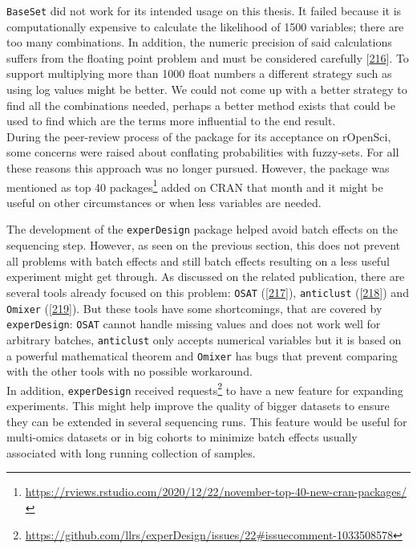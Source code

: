 \documentclass[
  a4paper,
]{book}
\DeclareRobustCommand{\href}[2]{#2\footnote{\url{#1}}}
\begin{document}
\texttt{BaseSet} did not work for its intended usage on this thesis.
It failed because it is computationally expensive to calculate the likelihood of 1500 variables; there are too many combinations.
In addition, the numeric precision of said calculations suffers from the floating point problem and must be considered carefully {[}\protect\hyperlink{ref-goldberg1991}{216}{]}.
To support multiplying more than 1000 float numbers a different strategy such as using log values might be better.
We could not come up with a better strategy to find all the combinations needed, perhaps a better method exists that could be used to find which are the terms more influential to the end result.\\
During the peer-review process of the package for its acceptance on rOpenSci, some concerns were raised about conflating probabilities with fuzzy-sets.
For all these reasons this approach was no longer pursued.
However, the package was mentioned as \href{https://rviews.rstudio.com/2020/12/22/november-top-40-new-cran-packages/}{top 40 packages} added on CRAN that month and it might be useful on other circumstances or when less variables are needed.

The development of the \texttt{experDesign} package helped avoid batch effects on the sequencing step.
However, as seen on the previous section, this does not prevent all problems with batch effects and still batch effects resulting on a less useful experiment might get through.
As discussed on the related publication, there are several tools already focused on this problem: \texttt{OSAT} ({[}\protect\hyperlink{ref-yan2012}{217}{]}), \texttt{anticlust} ({[}\protect\hyperlink{ref-papenberg2020}{218}{]}) and \texttt{Omixer} ({[}\protect\hyperlink{ref-sinke2021}{219}{]}).
But these tools have some shortcomings, that are covered by \texttt{experDesign}: \texttt{OSAT} cannot handle missing values and does not work well for arbitrary batches, \texttt{anticlust} only accepts numerical variables but it is based on a powerful mathematical theorem and \texttt{Omixer} has bugs that prevent comparing with the other tools with no possible workaround.\\
In addition, \texttt{experDesign} received \href{https://github.com/llrs/experDesign/issues/22\#issuecomment-1033508578}{requests} to have a new feature for expanding experiments.
This might help improve the quality of bigger datasets to ensure they can be extended in several sequencing runs.
This feature would be useful for multi-omics datasets or in big cohorts to minimize batch effects usually associated with long running collection of samples.
\end{document}
